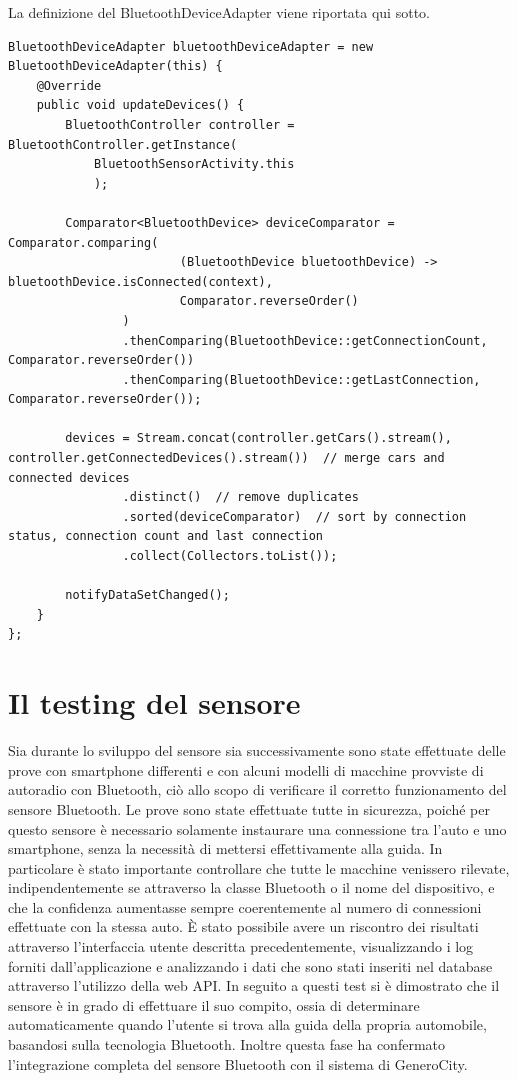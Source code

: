 La definizione del BluetoothDeviceAdapter viene riportata qui sotto.
\begin{verbatim}
BluetoothDeviceAdapter bluetoothDeviceAdapter = new BluetoothDeviceAdapter(this) {
    @Override
    public void updateDevices() {
        BluetoothController controller = BluetoothController.getInstance(
            BluetoothSensorActivity.this
            );

        Comparator<BluetoothDevice> deviceComparator = Comparator.comparing(
                        (BluetoothDevice bluetoothDevice) -> bluetoothDevice.isConnected(context),
                        Comparator.reverseOrder()
                )
                .thenComparing(BluetoothDevice::getConnectionCount, Comparator.reverseOrder())
                .thenComparing(BluetoothDevice::getLastConnection, Comparator.reverseOrder());

        devices = Stream.concat(controller.getCars().stream(), controller.getConnectedDevices().stream())  // merge cars and connected devices
                .distinct()  // remove duplicates
                .sorted(deviceComparator)  // sort by connection status, connection count and last connection
                .collect(Collectors.toList());

        notifyDataSetChanged();
    }
};
\end{verbatim}


\section{Il testing del sensore}
Sia durante lo sviluppo del sensore sia successivamente sono state effettuate delle prove con smartphone differenti e con alcuni modelli di macchine provviste di autoradio con Bluetooth, ciò allo scopo di verificare il corretto funzionamento del sensore Bluetooth. Le prove sono state effettuate tutte in sicurezza, poiché per questo sensore è necessario solamente instaurare una connessione tra l'auto e uno smartphone, senza la necessità di mettersi effettivamente alla guida. In particolare è stato importante controllare che tutte le macchine venissero rilevate, indipendentemente se attraverso la classe Bluetooth o il nome del dispositivo, e che la confidenza aumentasse sempre coerentemente al numero di connessioni effettuate con la stessa auto. È stato possibile avere un riscontro dei risultati attraverso l'interfaccia utente descritta precedentemente, visualizzando i log forniti dall'applicazione e analizzando i dati che sono stati inseriti nel database attraverso l'utilizzo della web API. In seguito a questi test si è dimostrato che il sensore è in grado di effettuare il suo compito, ossia di determinare automaticamente quando l'utente si trova alla guida della propria automobile, basandosi sulla tecnologia Bluetooth. Inoltre questa fase ha confermato l'integrazione completa del sensore Bluetooth con il sistema di GeneroCity.